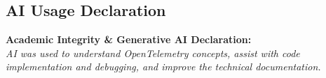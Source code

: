 \documentclass[11pt,a4paper]{article}
\begin{document}
\vspace{0.4cm}

\subsection{AI Usage Declaration}
\begin{summarybox}
    \textbf{Academic Integrity \& Generative AI Declaration:}\\
    \textit{AI was used to understand OpenTelemetry concepts, assist with code implementation and debugging, and improve the technical documentation.}
\end{summarybox}
\end{document}
